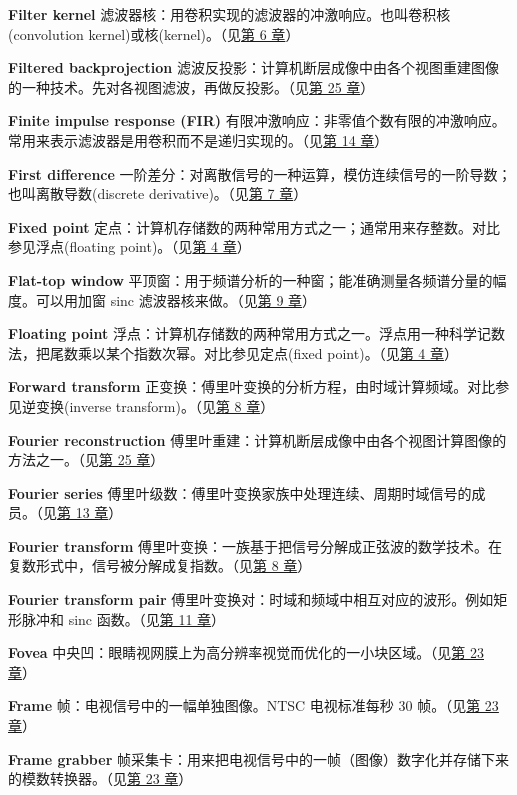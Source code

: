 \textbf{Filter kernel}
滤波器核：用卷积实现的滤波器的冲激响应。也叫卷积核(convolution
kernel)或核(kernel)。（见\hyperref[ch-06]{第 6 章}）

\textbf{Filtered backprojection}
滤波反投影：计算机断层成像中由各个视图重建图像的一种技术。先对各视图滤波，再做反投影。（见\hyperref[ch-25]{第
25 章}）

\textbf{Finite impulse response (FIR)}
有限冲激响应：非零值个数有限的冲激响应。常用来表示滤波器是用卷积而不是递归实现的。（见\hyperref[ch-14]{第
14 章}）

\textbf{First difference}
一阶差分：对离散信号的一种运算，模仿连续信号的一阶导数；也叫离散导数(discrete
derivative)。（见\hyperref[ch-07]{第 7 章}）

\textbf{Fixed point}
定点：计算机存储数的两种常用方式之一；通常用来存整数。对比参见浮点(floating
point)。（见\hyperref[ch-04]{第 4 章}）

\textbf{Flat-top window}
平顶窗：用于频谱分析的一种窗；能准确测量各频谱分量的幅度。可以用加窗
sinc 滤波器核来做。（见\hyperref[ch-09]{第 9 章}）

\textbf{Floating point}
浮点：计算机存储数的两种常用方式之一。浮点用一种科学记数法，把尾数乘以某个指数次幂。对比参见定点(fixed
point)。（见\hyperref[ch-04]{第 4 章}）

\textbf{Forward transform}
正变换：傅里叶变换的分析方程，由时域计算频域。对比参见逆变换(inverse
transform)。（见\hyperref[ch-08]{第 8 章}）

\textbf{Fourier reconstruction}
傅里叶重建：计算机断层成像中由各个视图计算图像的方法之一。（见\hyperref[ch-25]{第
25 章}）

\textbf{Fourier series}
傅里叶级数：傅里叶变换家族中处理连续、周期时域信号的成员。（见\hyperref[ch-13]{第
13 章}）

\textbf{Fourier transform}
傅里叶变换：一族基于把信号分解成正弦波的数学技术。在复数形式中，信号被分解成复指数。（见\hyperref[ch-08]{第
8 章}）

\textbf{Fourier transform pair}
傅里叶变换对：时域和频域中相互对应的波形。例如矩形脉冲和 sinc
函数。（见\hyperref[ch-11]{第 11 章}）

\textbf{Fovea}
中央凹：眼睛视网膜上为高分辨率视觉而优化的一小块区域。（见\hyperref[ch-23]{第
23 章}）

\textbf{Frame} 帧：电视信号中的一幅单独图像。NTSC 电视标准每秒 30
帧。（见\hyperref[ch-23]{第 23 章}）

\textbf{Frame grabber}
帧采集卡：用来把电视信号中的一帧（图像）数字化并存储下来的模数转换器。（见\hyperref[ch-23]{第
23 章}）

